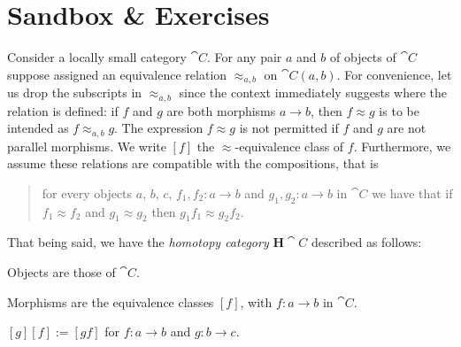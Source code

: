 
\section{Sandbox \& Exercises}

\begin{sandbox}
Consider a locally small category  \(\cat C\). For any pair \(a\) and \(b\) of objects of \(\cat C\) suppose assigned an equivalence relation \(\approx_{a, b}\) on \(\cat C (a, b)\). For convenience, let us drop the subscripts in \(\approx_{a, b}\) since the context immediately suggests where the relation is defined: if \(f\) and \(g\) are both morphisms \(a \to b\), then \(f \approx g\) is to be intended as \(f \approx_{a, b} g\). The expression \(f \approx g\) is not permitted if \(f\) and \(g\) are not parallel morphisms. We write \([f]\) the \(\approx\)-equivalence class of \(f\). Furthermore, we assume these relations are compatible with the compositions, that is
\begin{quotation}
for every objects \(a\), \(b\), \(c\), \(f_1, f_2 : a \to b\) and \(g_1, g_2 : a \to b\) in \(\cat C\) we have that if \(f_1 \approx f_2\) and \(g_1 \approx g_2\) then \(g_1f_1 \approx g_2f_2\).
\end{quotation}
That being said, we have the {\em homotopy category} \(\mathbf H \cat C\) described as follows:
\begin{tcbitem}
\item Objects are those of \(\cat C\).
\item Morphisms are the equivalence classes \([f]\), with \(f : a \to b\) in \(\cat C\).
\item \([g] [f] := [gf]\) for \(f : a \to b\) and \(g : b \to c\).
\end{tcbitem}
\end{sandbox}
